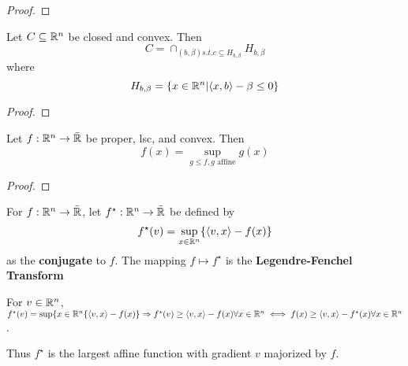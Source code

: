 \begin{proof}
\end{proof}

\begin{thm}
  \label{defn:conjugate_functions:3}
  Let $C \subseteq \mathbb{R}^{n}$ be closed and convex.  Then
  \begin{equation}
    \label{eq:50}
    C = \cap_{(b, \beta) s.t. c \subseteq H_{b, \beta}} H_{b, \beta}
  \end{equation} where
  \begin{equation}
    \label{eq:51}
    H_{b, \beta} = \{ x \in \mathbb{R}^{n} | \langle x, b \rangle - \beta
    \leq 0 \}
  \end{equation}
\end{thm}

\begin{proof}
  \todo{}
\end{proof}

\begin{thm}
  \label{defn:conjugate_functions:4}
  Let $f: \mathbb{R}^{n} \rightarrow \bar {\mathbb{R}}$ be proper, lsc, and convex.
  Then
  \begin{equation}
    \label{eq:52}
    f(x) = \sup_{g \leq f, \text{$g$ affine}} g(x)
  \end{equation}
\end{thm}

\begin{proof}
\end{proof}

\begin{defn}
  \label{defn:conjugate_functions:5}
  For $f: \mathbb{R}^{n} \rightarrow \bar {\mathbb{R}}$, let $f^{\star}: \mathbb{R}^{n}
  \rightarrow \bar {\mathbb{R}}$ be defined by
  \begin{equation}
    \label{eq:53}
    f^{\star}(v) = \sup_{x \in \mathbb{R}^{n}} \{ \langle v, x \rangle - f(x) \}
  \end{equation}
  as the \textbf{conjugate} to $f$. The mapping $f \mapsto f^{\star}$
  is the \textbf{Legendre-Fenchel Transform}
\end{defn}

\begin{remark}
  For $v \in \mathbb{R}^{n}$, $f^{\star}(v) = \sup \{ x \in \mathbb{R}^{n} \{ \langle
  v, x \rangle - f(x) \} \Rightarrow f^{\star}(v) \geq \langle v, x
  \rangle - f(x) \forall x \in \mathbb{R}^{n} \iff f(x) \geq \langle v, x
  \rangle - f^{\star}(x) \forall x \in \mathbb{R}^n$.

  Thus $f^{\star}$ is the largest affine function with gradient $v$
  majorized by $f$.
\end{remark}

